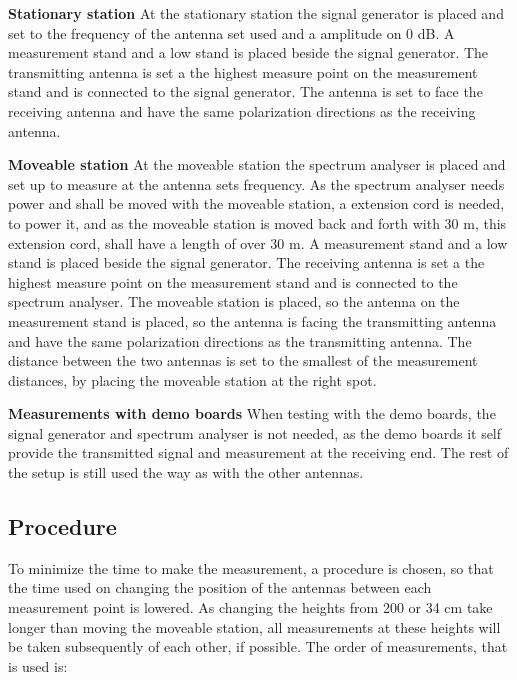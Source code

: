 \textbf{Stationary station}
At the stationary station the signal generator is placed and set to the frequency of the antenna set used and a amplitude on 0 dB. A measurement stand and a low stand is placed beside the signal generator. The transmitting antenna is set a the highest measure point on the measurement stand and is connected to the signal generator. The antenna is set to face the receiving antenna and have the same polarization directions as the receiving antenna.

\textbf{Moveable station}
At the moveable station the spectrum analyser is placed and set up to measure at the antenna sets frequency. As the spectrum analyser needs power and shall be moved with the moveable station, a extension cord is needed, to power it, and as the moveable station is moved back and forth with 30 m, this extension cord, shall have a length of over 30 m. A measurement stand and a low stand is placed beside the signal generator. The receiving antenna is set a the highest measure point on the measurement stand and is connected to the spectrum analyser. The moveable station is placed, so the antenna on the measurement stand is placed, so the antenna is facing the transmitting antenna and have the same polarization directions as the transmitting antenna. The distance between the two antennas is set to the smallest of the measurement distances, by placing the moveable station at the right spot.

\textbf{Measurements with demo boards}
When testing with the demo boards, the signal generator and spectrum analyser is not needed, as the demo boards it self provide the transmitted signal and measurement at the receiving end. The rest of the setup is still used the way as with the other antennas.

\subsection*{Procedure}
To minimize the time to make the measurement, a procedure is chosen, so that the time used on changing the position of the antennas between each measurement point is lowered.
As changing the heights from 200 or 34 cm take longer than moving the moveable station, all measurements at these heights will be taken subsequently of each other, if possible. 
The order of measurements, that is used is:

